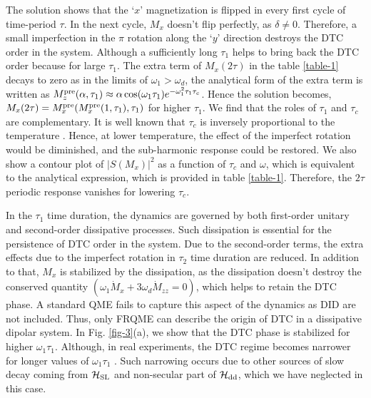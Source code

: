 \documentclass[prl,aps,twocolumn,floatfix]{revtex4-1}
\newcommand{\hsl}{\mathcal{H}_{\scriptstyle \rm SL}}
\newcommand{\hdd}{\mathcal{H}_{\scriptstyle \rm dd}}
\begin{document}
The solution shows that the `$x$' magnetization is flipped in every first cycle of time-period $\tau$. In
the next cycle, $M_x$ doesn't flip perfectly, as $\delta \neq 0$. Therefore, a small imperfection in the
$\pi$ rotation along the `$y$' direction destroys the DTC order in the system. Although a sufficiently long
$\tau_1$ helps to bring back the DTC order because for large $\tau_1$. The extra term of $M_x (2\tau)$ in
the table \ref{table-1} decays to zero as in the limits of $\omega_1> \omega_{d}$, the analytical form of
the extra term is written as $M_z^{\scriptstyle \rm pre}(\alpha, \tau_1) \approx \alpha\cos(\omega_1
\tau_1) e^{-\omega_1^2 \tau_1 \tau_c}$. Hence the solution becomes, $M_x (2\tau) = M_x^{\scriptstyle
\rm pre}(M_x^{\scriptstyle \rm pre}(1, \tau_1), \tau_1) $  for higher $\tau_1$. We find that the roles of $\tau_1$ and $\tau_c$ are
complementary. It is well known that $\tau_c$ is inversely proportional to the temperature
\cite{chakrabarti2018a}. Hence, at lower temperature, the effect of the imperfect rotation would be
diminished, and the sub-harmonic response could be restored. We also show a contour plot of $\vert
S(M_x)\vert^2$ as a function of $\tau_c$ and $\omega$, which is equivalent to the analytical expression,
which is provided in table \ref{table-1}. Therefore, the $2\tau$ periodic response vanishes for lowering
$\tau_c$. 


In the $\tau_1$ time duration, the dynamics are governed by both first-order unitary and second-order
dissipative processes. Such dissipation is essential for the persistence of DTC order in the system. Due to
the second-order terms, the extra effects due to the imperfect rotation in $\tau_2$ time duration are
reduced. In addition to that, $M_x$ is stabilized by the dissipation,  as the dissipation doesn't destroy
the conserved quantity  $(\omega_1\dot{M}_x + 3 \omega_{d}\dot{M}_{zz}  = 0)$,  which helps to retain the
DTC phase. A standard QME fails to capture this aspect of the dynamics as DID are not included. Thus, only FRQME can
describe the origin of DTC in a dissipative dipolar system. 
In Fig. \ref{fig-3}(a),
we show that the DTC phase is stabilized for higher $\omega_1 \tau_1$. Although, in real experiments, the
DTC regime becomes narrower for longer values of $\omega_1 \tau_1$
\cite{choi_observation_2017,ho_critical_2017}. Such narrowing occurs due to other sources of
slow decay coming from $\hsl$ and non-secular part of $\hdd$, which we have neglected in this case. 
\end{document}
